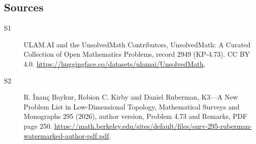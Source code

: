 \documentclass[11pt]{article}
\begin{document}
\subsection{Sources}
\begin{description}
\item[\hypertarget{source:2949:1}{S1}] ULAM.AI and the UnsolvedMath Contributors, UnsolvedMath: A Curated Collection of Open Mathematics Problems, record 2949 (KP-4.73). CC BY 4.0. \url{https://huggingface.co/datasets/ulamai/UnsolvedMath}.
\item[\hypertarget{source:2949:2}{S2}] R. İnanç Baykur, Robion C. Kirby and Daniel Ruberman, K3—A New Problem List in Low-Dimensional Topology, Mathematical Surveys and Monographs 295 (2026), author version, Problem 4.73 and Remarks, PDF page 250. \url{https://math.berkeley.edu/sites/default/files/surv-295-ruberman-watermarked-author-pdf.pdf}.
\end{description}
\label{end:2949}
\end{document}
